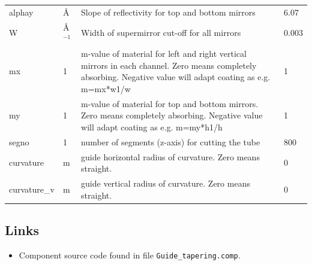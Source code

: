 \begin{longtable}{p{}p{}p{}p{}}
alphay & \AA{} & Slope of reflectivity for top and bottom mirrors & 6.07 \\
W & \AA{}$^{-1}$ & Width of supermirror cut-off for all mirrors & 0.003 \\
mx & 1 & m-value of material for left and right vertical mirrors in each channel. Zero means completely absorbing. Negative  value will adapt coating as e.g. m=mx*w1/w & 1 \\
my & 1 & m-value of material for top and bottom mirrors. Zero means completely absorbing. Negative value will adapt coating as e.g. m=my*h1/h & 1 \\
segno & 1 & number of segments (z-axis) for cutting the tube & 800 \\
curvature & m & guide horizontal radius of curvature. Zero means straight. & 0 \\
curvature\_v & m & guide vertical radius of curvature. Zero means straight. & 0 \\
\bottomrule
\end{longtable}

\subsection*{Links}
\begin{itemize}
  \item Component source code found in file \texttt{Guide\_tapering.comp}.
\end{itemize}
